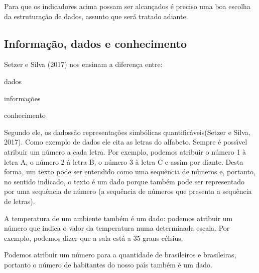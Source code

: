 \documentclass[
12pt,		%
openright,	%
twoside,  %
a4paper,			%
chapter=TITLE,		%
english,			%
french,				%
spanish,			%
brazil				%
]{USPSC-classe/USPSC_RedarTex}
\begin{document}
Para que os indicadores acima possam ser alcan\c{c}ados \'e preciso uma boa escolha da estrutura\c{c}\~ao de dados, assunto que ser\'a tratado adiante.








\subsection[Informa\c{c}\~ao, dados e conhecimento]{Informa\c{c}\~ao, dados e conhecimento}\label{Informa\c{c}\~ao, dados e conhecimento}
 Setzer e Silva (2017)  nos ensinam a diferen\c{c}a entre:









\begin{alineas}
\item dados
\item informa\c{c}\~oes
\item conhecimento
\end{alineas}

Segundo ele, os \textquotedbl dados\textquotedbl  s\~ao \textquotedbl representa\c{c}\~oes simb\'olicas quantific\'aveis\textquotedbl   (Setzer e Silva, 2017). Como exemplo de dados ele cita as letras do alfabeto. Sempre \'e poss\'{\i}vel atribuir um n\'umero a cada letra. Por exemplo, podemos atribuir o n\'umero 1 \`a letra A, o n\'umero 2 \`a letra B, o n\'umero 3 \`a letra C e assim por diante. Desta forma, um texto pode ser entendido como uma sequ\^encia de n\'umeros e, portanto, no sentido indicado, o texto \'e um dado porque tamb\'em pode ser representado por uma sequ\^encia de n\'umero (a sequ\^encia de n\'umeros que presenta a sequ\^encia de letras).








A temperatura de um ambiente tamb\'em \'e um dado: podemos atribuir um n\'umero que indica o valor da temperatura numa determinada escala. Por exemplo, podemos dizer que a sala \textquotedbl est\'a a 35 graus c\'elsius\textquotedbl .








Podemos atribuir um n\'umero para a quantidade de brasileiros e brasileiras, portanto o n\'umero de habitantes do nosso pa\'{\i}s tamb\'em \'e um dado.
\end{document}
